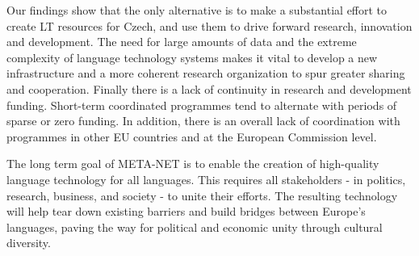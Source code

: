 \documentclass[]{../../metanetpaper}
\begin{document}
\begin{multicols}{2}
Our findings show that the only alternative is to make a substantial effort to create LT resources for Czech, and use them to drive forward research, innovation and development. The need for large amounts of data and the extreme complexity of language technology systems makes it vital to develop a new infrastructure and a more coherent research organization to spur greater sharing and cooperation.
Finally there is a lack of continuity in research and development funding. Short-term coordinated programmes tend to alternate with periods of sparse or zero funding. In addition, there is an overall lack of coordination with programmes in other EU countries and at the European Commission level.

The long term goal of META-NET is to enable the creation of high-quality language technology for all languages. This requires all stakeholders - in politics, research, business, and society - to unite their efforts. The resulting technology will help tear down existing barriers and build bridges between Europe’s languages, paving the way for political and economic unity through cultural diversity.
\end{multicols}

\clearpage
\end{document}
